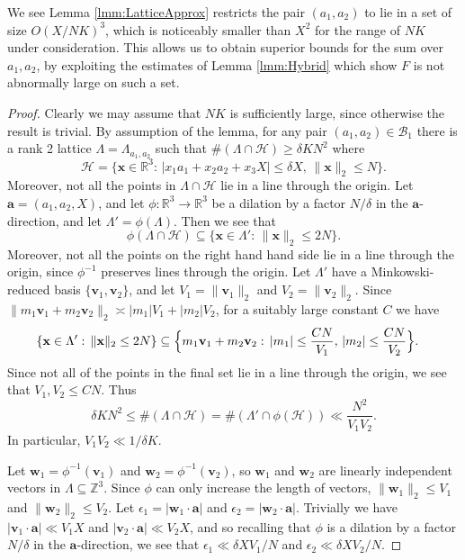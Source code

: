 \documentclass[10pt]{amsart}
\theoremstyle{plain}
\numberwithin{sblmm}{thrm}
\numberwithin{equation}{section}
\begin{document}
%
%
%
%
We see Lemma \ref{lmm:LatticeApprox} restricts the pair $(a_1,a_2)$ to lie in a set of size $O(X/N K)^3$, which is noticeably smaller than $X^2$ for the range of $N K$ under consideration. This allows us to obtain superior bounds for the sum over $a_1,a_2$, by exploiting the estimates of Lemma \ref{lmm:Hybrid} which show $F$ is not abnormally large on such a set. 
%
%
%
%
\begin{proof} Clearly we may assume that $N K$ is sufficiently large, since otherwise the result is trivial. By assumption of the lemma, for any pair $(a_1,a_2)\in\mathcal{B}_1$ there is a rank 2 lattice $\Lambda=\Lambda_{a_1,a_2}$ such that $\#(\Lambda\cap\mathcal{H})\ge \delta K N^2$ where  
\[
\mathcal{H}=\{\mathbf{x}\in\mathbb{R}^3:\,| x_1 a_1+x_2 a_2+x_3 X|\le \delta X,\,\|\mathbf{x}\|_2\le N\}.
\]
Moreover, not all the points in $\Lambda\cap\mathcal{H}$ lie in a line through the origin. Let $\mathbf{a}=(a_1,a_2,X)$, and let $\phi:\mathbb{R}^3\rightarrow\mathbb{R}^3$ be a dilation by a factor $N/\delta$ in the $\mathbf{a}$-direction, and let $\Lambda'=\phi(\Lambda)$. Then we see that
\[
\phi(\Lambda\cap\mathcal{H})\subseteq \{\mathbf{x}\in\Lambda':\,\|\mathbf{x}\|_2\le 2N\}.
\] 
Moreover, not all the points on the right hand hand side lie in a line through the origin, since $\phi^{-1}$ preserves lines through the origin. Let $\Lambda'$ have a Minkowski-reduced basis $\{\mathbf{v}_1,\mathbf{v}_2\}$, and let $V_1=\|\mathbf{v}_1\|_2$ and $V_2=\|\mathbf{v}_2\|_2$. Since $\|m_1\mathbf{v}_1+m_2\mathbf{v}_2\|_2\asymp |m_1|V_1+|m_2|V_2$, for a suitably large constant $C$ we have
\begin{align*}
\{\mathbf{x}\in\Lambda':\,\|\mathbf{x}\|_2\le 2 N\}&\subseteq \Bigl\{m_1\mathbf{v}_1+m_2\mathbf{v}_2:\,|m_1|\le \frac{C N}{ V_1},\,|m_2|\le \frac{C N}{V_2}\Bigr\}.
\end{align*}
Since not all of the points in the final set lie in a line through the origin, we see that $V_1,V_2\le C N$. Thus
\[
\delta K N^2\le \#(\Lambda\cap\mathcal{H})=\#(\Lambda'\cap\phi(\mathcal{H}))\ll \frac{N^2}{V_1 V_2}.
\]
In particular, $V_1V_2\ll 1/\delta K$.

Let $\mathbf{w}_1=\phi^{-1}(\mathbf{v}_1)$ and $\mathbf{w}_2=\phi^{-1}(\mathbf{v}_2)$, so $\mathbf{w}_1$ and $\mathbf{w}_2$ are linearly independent vectors in $\Lambda\subseteq\mathbb{Z}^3$. Since $\phi$ can only increase the length of vectors, $\|\mathbf{w}_1\|_2\le V_1$ and $\|\mathbf{w}_2\|_2\le V_2$. Let  $\epsilon_1=|\mathbf{w}_1\cdot \mathbf{a}|$ and $\epsilon_2=|\mathbf{w}_2\cdot \mathbf{a}|$. Trivially we have $|\mathbf{v}_1\cdot \mathbf{a}|\ll V_1X$ and $|\mathbf{v}_2\cdot\mathbf{a}|\ll V_2X$, and so recalling that $\phi$ is a dilation by a factor $N/\delta$ in the $\mathbf{a}$-direction, we see that $\epsilon_1\ll \delta X V_1/N$ and $\epsilon_2\ll \delta X V_2/N$.


\end{proof}
\end{document}
